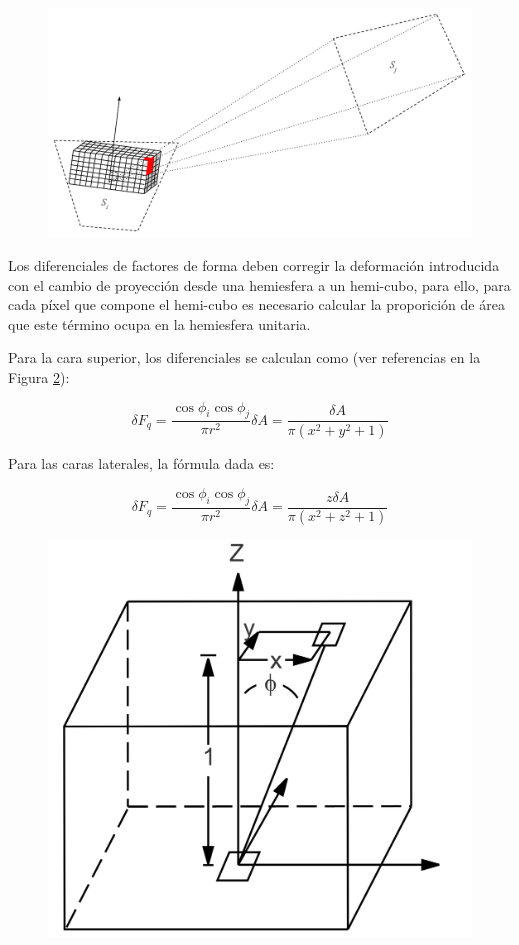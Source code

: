 \vspace{5mm}
\begin{figure}[H]
	\centering
	\includegraphics[width=0.8\linewidth]{assets/Hemicube}
	\label{img:ff}
\end{figure}

Los diferenciales de factores de forma deben corregir la deformación introducida con el cambio de proyección desde una hemiesfera a un hemi-cubo, para ello, para cada píxel que compone el hemi-cubo es necesario calcular la proporición de área que este término ocupa en la hemiesfera unitaria.

Para la cara superior, los diferenciales se calculan como (ver referencias en la Figura \ref{img:deltaff}):

\begin{equation}
	\delta{F_{q}} = \frac{\cos{\phi_{i}}\cos{\phi_{j}}}{\pi{r^{2}}} \delta{A} = \frac{\delta{A}}{\pi({x^{2} + y^{2} + 1})} 
\end{equation}

Para las caras laterales, la fórmula dada es:

\begin{equation}
\delta{F_{q}} = \frac{\cos{\phi_{i}}\cos{\phi_{j}}}{\pi{r^{2}}}\delta{A} = \frac{z\delta{A}}{\pi({x^{2} + z^{2} + 1})}
\end{equation}

\begin{figure}[H]
	\centering
	\includegraphics[width=0.6\linewidth]{assets/deltaff}
	\label{img:deltaff}
\end{figure}


